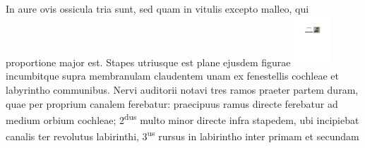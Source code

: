 In aure ovis ossicula tria sunt, sed
quam in vitulis excepto malleo, qui proportione major est.
Stapes 
utriusque est plane ejusdem figurae %
\includegraphics[trim = 0mm 1mm 0mm 0mm, clip,width=0.1\textwidth]{images/lh0040104b_007r3.pdf} incumbitque supra membranulam claudentem unam ex fenestellis cochleae et labyrintho communibus. Nervi auditorii notavi tres ramos praeter partem duram, quae per proprium canalem ferebatur: praecipuus ramus directe ferebatur ad medium orbium cochleae; 2\textsuperscript{dus} multo minor directe infra stapedem, ubi incipiebat canalis ter revolutus labirinthi, 3\textsuperscript{us} rursus in labirintho inter primam et secundam
